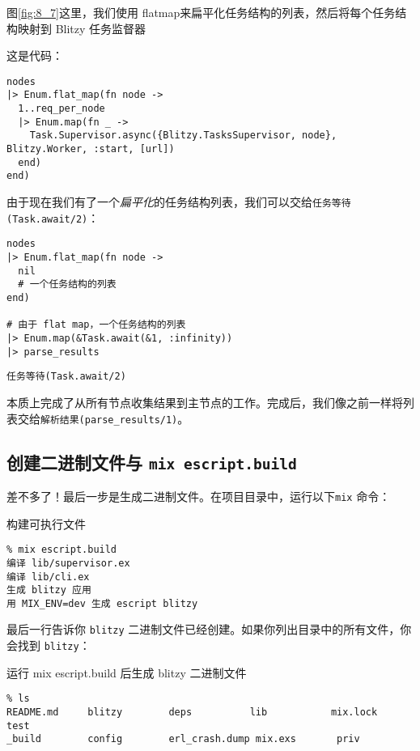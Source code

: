 图\ref{fig:8_7}这里，我们使用 flatmap来扁平化任务结构的列表，然后将每个任务结构映射到 Blitzy 任务监督器

这是代码：

\begin{code}{}
\begin{verbatim}
nodes
|> Enum.flat_map(fn node ->
  1..req_per_node
  |> Enum.map(fn _ ->
    Task.Supervisor.async({Blitzy.TasksSupervisor, node}, Blitzy.Worker, :start, [url])
  end)
end)
\end{verbatim}
\end{code}

由于现在我们有了一个\emph{扁平化}的任务结构列表，我们可以交给\texttt{任务等待(Task.await/2)}：

\begin{code}{}
\begin{verbatim}
nodes
|> Enum.flat_map(fn node ->
  nil
  # 一个任务结构的列表
end)

# 由于 flat map，一个任务结构的列表
|> Enum.map(&Task.await(&1, :infinity))
|> parse_results
\end{verbatim}
\end{code}

\texttt{任务等待(Task.await/2)}

本质上完成了从所有节点收集结果到主节点的工作。完成后，我们像之前一样将列表交给\texttt{解析结果(parse\_results/1)}。

\subsection{创建二进制文件与 \texttt{mix escript.build}}

差不多了！最后一步是生成二进制文件。在项目目录中，运行以下\texttt{mix} 命令：

\begin{code}{构建可执行文件}

\begin{verbatim}
% mix escript.build
编译 lib/supervisor.ex
编译 lib/cli.ex
生成 blitzy 应用
用 MIX_ENV=dev 生成 escript blitzy
\end{verbatim}
\end{code}

最后一行告诉你 \texttt{blitzy}
二进制文件已经创建。如果你列出目录中的所有文件，你会找到
\texttt{blitzy}：

\begin{code}{运行 mix escript.build 后生成 blitzy 二进制文件}
\begin{verbatim}
% ls
README.md     blitzy        deps          lib           mix.lock      test
_build        config        erl_crash.dump mix.exs       priv
\end{verbatim}
\end{code}

